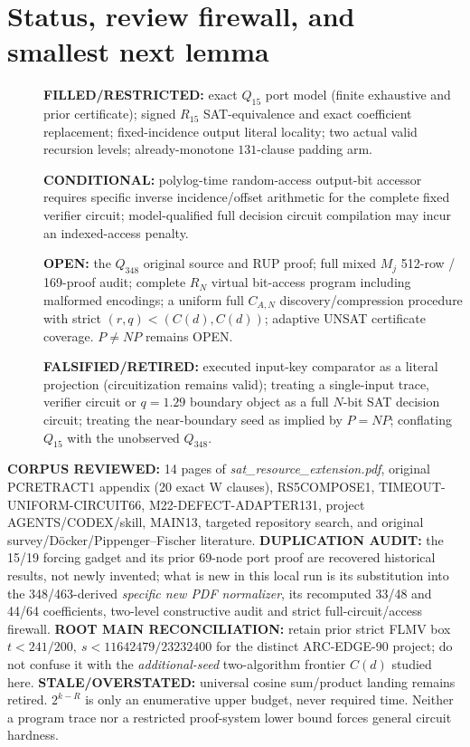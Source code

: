 \documentclass[11pt]{article}
\begin{document}
\section{Status, review firewall, and smallest next lemma}
\begin{description}
\item[] \textbf{FILLED/RESTRICTED:} exact \(Q_{15}\)
port model (finite exhaustive and prior certificate);
signed \(R_{15}\) SAT-equivalence and exact coefficient
replacement; fixed-incidence output literal locality;
two actual valid recursion levels; already-monotone
\(131\)-clause padding arm.
\item[] \textbf{CONDITIONAL:} polylog-time
random-access output-bit accessor requires specific
inverse incidence/offset arithmetic for the complete
fixed verifier circuit; model-qualified full decision
circuit compilation may incur an indexed-access penalty.
\item[] \textbf{OPEN:} the \(Q_{348}\) original source
and RUP proof; full mixed \(M_j\) 512-row / 169-proof
audit; complete \(R_N\) virtual bit-access program
including malformed encodings; a uniform
full \(C_{A,N}\) discovery/compression procedure with
strict \((r,q)<(C(d),C(d))\); adaptive UNSAT
certificate coverage. \(P\ne NP\) remains OPEN.
\item[] \textbf{FALSIFIED/RETIRED:} executed
input-key comparator as a literal projection
(circuitization remains valid); treating a
single-input trace, verifier circuit or \(q=1.29\)
boundary object as a full \(N\)-bit SAT
decision circuit; treating the near-boundary seed
as implied by \(P=NP\); conflating \(Q_{15}\)
with the unobserved \(Q_{348}\).
\end{description}
\textbf{CORPUS REVIEWED:} 14 pages of \emph{sat\_resource\_extension.pdf},
original PCRETRACT1 appendix (20 exact W clauses),
RS5COMPOSE1, TIMEOUT-UNIFORM-CIRCUIT66, M22-DEFECT-ADAPTER131,
project AGENTS/CODEX/skill, MAIN13, targeted repository search,
and original survey/D\"ocker/Pippenger--Fischer literature.
\textbf{DUPLICATION AUDIT:} the 15/19 forcing gadget and
its prior 69-node port proof are recovered historical results,
not newly invented; what is new in this local run is its
substitution into the 348/463-derived \emph{specific new
PDF normalizer}, its recomputed 33/48 and 44/64
coefficients, two-level constructive audit and strict
full-circuit/access firewall.
\textbf{ROOT MAIN RECONCILIATION:} retain prior
strict FLMV box \(t<241/200,\ s<11642479/23232400\)
for the distinct ARC-EDGE-90 project; do not confuse it
with the \emph{additional-seed} two-algorithm frontier
\(C(d)\) studied here.
\textbf{STALE/OVERSTATED:} universal cosine
sum/product landing remains retired. \(2^{k-R}\)
is only an enumerative upper budget, never required time.
Neither a program trace nor a restricted proof-system
lower bound forces general circuit hardness.
\end{document}
